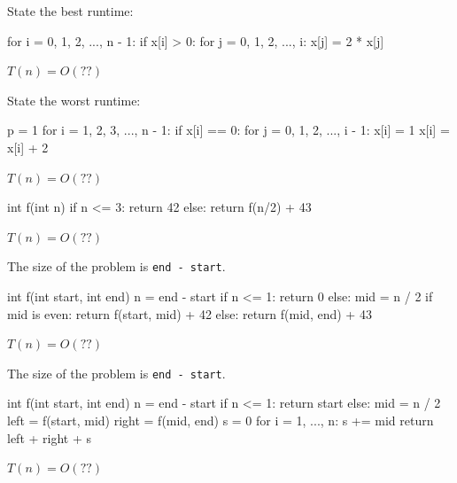 \nextq
State the best runtime:
\begin{console}[fontsize=\small]
for i = 0, 1, 2, ..., n - 1:
    if x[i] > 0:
        for j = 0, 1, 2, ..., i:
            x[j] = 2 * x[j]
\end{console}
\ANSWER
\begin{answerlong}
$T(n) = O(??)$
\end{answerlong}

\nextq
State the worst runtime:
\begin{console}[fontsize=\small]
p = 1
for i = 1, 2, 3, ..., n - 1:
    if x[i] == 0:
        for j = 0, 1, 2, ..., i - 1:
            x[i] = 1
    x[i] = x[i] + 2
\end{console}
\ANSWER
\begin{answerlong}
$T(n) = O(??)$
\end{answerlong}

\nextq
\begin{console}[fontsize=\small]
int f(int n)
{
    if n <= 3:
        return 42
    else:
        return f(n/2) + 43
}
\end{console}
\ANSWER
\begin{answerlong}
$T(n) = O(??)$
\end{answerlong}

\nextq
The size of the problem is \verb!end - start!.
\begin{console}[fontsize=\small]
int f(int start, int end)
{
    n = end - start
    if n <= 1:
        return 0
    else:
        mid = n / 2
        if mid is even:
            return f(start, mid) + 42
        else:
            return f(mid, end) + 43
}
\end{console}
\ANSWER
\begin{answerlong}
$T(n) = O(??)$
\end{answerlong}

\nextq
The size of the problem is \verb!end - start!.
\begin{console}[fontsize=\small]
int f(int start, int end)
{
    n = end - start
    if n <= 1:
        return start %
    else:
        mid = n / 2
        left = f(start, mid)
        right = f(mid, end)
        s = 0
        for i = 1, ..., n:
            s += mid
        return left + right + s
}
\end{console}
\ANSWER
\begin{answerlong}
$T(n) = O(??)$
\end{answerlong}

